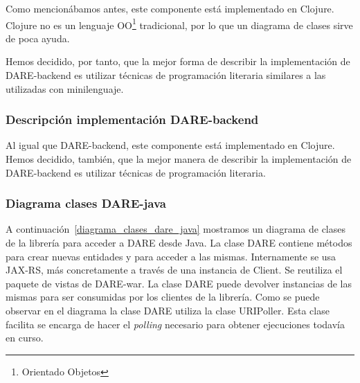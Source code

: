 Como mencionábamos antes, este componente está implementado en
Clojure. Clojure no es un lenguaje OO\footnote{Orientado Objetos}
tradicional, por lo que un diagrama de clases sirve de poca ayuda.

Hemos decidido, por tanto, que la mejor forma de describir la
implementación de DARE-backend es utilizar técnicas de programación
literaria similares a las utilizadas con minilenguaje.

\begin{landscape}
\begingroup
    \fontsize{9pt}{11pt}\selectfont
    
\endgroup
\end{landscape}

\subsubsection{Descripción implementación DARE-backend}

Al igual que DARE-backend, este componente está implementado en
Clojure. Hemos decidido, también, que la mejor manera de describir la
implementación de DARE-backend es utilizar técnicas de programación
literaria.

\begin{landscape}
\begingroup
    \fontsize{9pt}{11pt}\selectfont
    
\endgroup
\end{landscape}

\subsubsection{Diagrama clases DARE-java}
A continuación~\ref{diagrama_clases_dare_java} mostramos un diagrama
de clases de la librería para acceder a DARE desde Java. La clase DARE
contiene métodos para crear nuevas entidades y para acceder a las
mismas. Internamente se usa JAX-RS, más concretamente a través de una
instancia de Client. Se reutiliza el paquete de vistas de DARE-war. La
clase DARE puede devolver instancias de las mismas para ser consumidas
por los clientes de la librería. Como se puede observar en el diagrama
la clase DARE utiliza la clase URIPoller. Esta clase facilita se
encarga de hacer el \emph{polling} necesario para obtener ejecuciones
todavía en curso.

